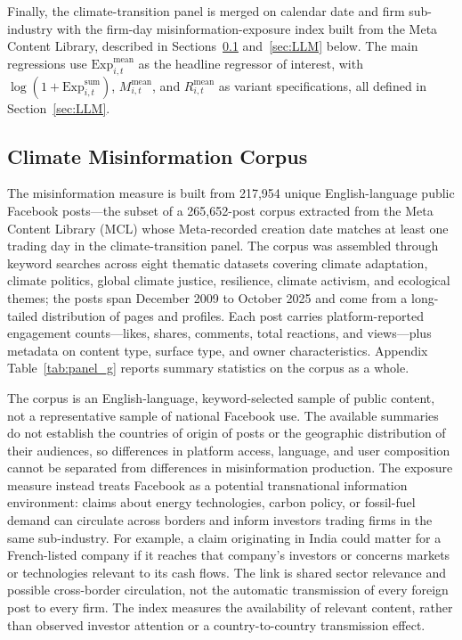 \documentclass{article}
\theoremstyle{plain}
\begin{document}
Finally, the climate-transition panel is merged on calendar date and firm sub-industry with the firm-day misinformation-exposure index built from the Meta Content Library, described in Sections~\ref{sec:data_misinfo} and~\ref{sec:LLM} below. The main regressions use $\mathrm{Exp}^{\text{mean}}_{i,t}$ as the headline regressor of interest, with $\log(1+\mathrm{Exp}^{\text{sum}}_{i,t})$, $M^{\text{mean}}_{i,t}$, and $R^{\text{mean}}_{i,t}$ as variant specifications, all defined in Section~\ref{sec:LLM}.

\subsection{Climate Misinformation Corpus}
\label{sec:data_misinfo}

The misinformation measure is built from 217,954 unique English-language public Facebook posts---the subset of a 265,652-post corpus extracted from the Meta Content Library (MCL) whose Meta-recorded creation date matches at least one trading day in the climate-transition panel. The corpus was assembled through keyword searches across eight thematic datasets covering climate adaptation, climate politics, global climate justice, resilience, climate activism, and ecological themes; the posts span December 2009 to October 2025 and come from a long-tailed distribution of pages and profiles. Each post carries platform-reported engagement counts---likes, shares, comments, total reactions, and views---plus metadata on content type, surface type, and owner characteristics. Appendix Table~\ref{tab:panel_g} reports summary statistics on the corpus as a whole.

The corpus is an English-language, keyword-selected sample of public content, not a representative sample of national Facebook use. The available summaries do not establish the countries of origin of posts or the geographic distribution of their audiences, so differences in platform access, language, and user composition cannot be separated from differences in misinformation production. The exposure measure instead treats Facebook as a potential transnational information environment: claims about energy technologies, carbon policy, or fossil-fuel demand can circulate across borders and inform investors trading firms in the same sub-industry. For example, a claim originating in India could matter for a French-listed company if it reaches that company's investors or concerns markets or technologies relevant to its cash flows. The link is shared sector relevance and possible cross-border circulation, not the automatic transmission of every foreign post to every firm. The index measures the availability of relevant content, rather than observed investor attention or a country-to-country transmission effect.
\end{document}
